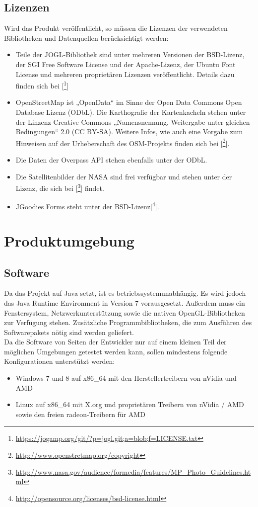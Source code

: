 \documentclass[10pt]{scrreprt}
\begin{document}
\section{Lizenzen}
Wird das Produkt veröffentlicht, so müssen die Lizenzen der verwendeten Bibliotheken und Datenquellen berücksichtigt werden:
\begin{itemize}
\item Teile der JOGL-Bibliothek sind unter mehreren Versionen der BSD-Lizenz, der SGI Free Software License und der Apache-Lizenz, der Ubuntu Font License und mehreren proprietären Lizenzen veröffentlicht. Details dazu finden sich bei [\footnote{\url{https://jogamp.org/git/?p=jogl.git;a=blob;f=LICENSE.txt}}]
\item OpenStreetMap ist „OpenData“ im Sinne der Open Data Commons Open Database Lizenz (ODbL). Die Karthografie der Kartenkacheln stehen unter der Linzenz  Creative Commons „Namensnennung, Weitergabe unter gleichen Bedingungen“ 2.0 (CC BY-SA). Weitere Infos, wie auch eine Vorgabe zum Hinweisen auf der Urheberschaft des OSM-Projekts finden sich bei [\footnote{\url{http://www.openstretmap.org/copyright}}].
\item Die Daten der Overpass API stehen ebenfalls unter der ODbL.
\item Die Satellitenbilder der NASA sind frei verfügbar und stehen unter der Lizenz, die sich bei [\footnote{\url{http://www.nasa.gov/audience/formedia/features/MP_Photo_Guidelines.html}}] findet.
\item JGoodies Forms steht unter der BSD-Lizenz[\footnote{\url{http://opensource.org/licenses/bsd-license.html}}].
\end{itemize}




\chapter{Produktumgebung}
\section{Software}
Da das Projekt auf Java setzt, ist es betriebssystemunabhängig. Es wird jedoch das Java Runtime Environment in Version 7 vorausgesetzt. Außerdem muss ein Fenstersystem, Netzwerkunterstützung sowie die nativen OpenGL-Bibliotheken zur Verfügung stehen. Zusätzliche Programmbibliotheken, die zum Ausführen des Softwarepakets nötig sind werden geliefert.\\

Da die Software von Seiten der Entwickler nur auf einem kleinen Teil der möglichen Umgebungen getestet werden kann, sollen mindestens folgende Konfigurationen unterstützt werden:
\begin{itemize}
\item Windows 7 und 8 auf x86{\_}64 mit den Herstellertreibern von nVidia und AMD
\item Linux auf x86{\_}64 mit X.org und proprietären Treibern von nVidia / AMD sowie den freien radeon-Treibern für AMD
\end{itemize}
\end{document}
